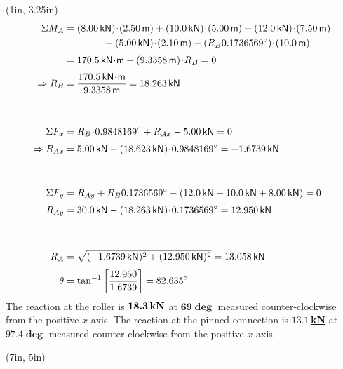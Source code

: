 \documentclass[10pt,oneside]{article}
\begin{document}
\begin{textblock*}{4.75in}(1in, 3.25in) 
  \begin{align*}
    \Sigma M_A &= (8.00\,\mathsf{kN})\cd(2.50\,\mathsf{m})+(10.0\,\mathsf{kN})\cd(5.00\,\mathsf{m})+(12.0\,\mathsf{kN})\cd(7.50\,\mathsf{m})\\
    &\qquad\qquad +(5.00\,\mathsf{kN})\cd(2.10\,\mathsf{m})-(R_B\sin 69\deg)\cd(10.0\,\mathsf{m})\\[0.25em]
    &= 170.5\,\mathsf{kN\cd m}-(9.3358\,\mathsf{m})\cd R_B = 0 \\[0.25em]
    \Ra R_B &= \frac{170.5\,\mathsf{kN\cd m}}{9.3358\,\mathsf{m}} = 18.263\,\mathsf{kN} \\\\\\
    \Sigma F_x &= R_B\cd\cos 69\deg + R_{Ax} - 5.00\,\mathsf{kN} = 0 \\[0.25em]
    \Ra R_{Ax} &= 5.00\,\mathsf{kN} - (18.623\,\mathsf{kN})\cd\cos 69\deg = -1.6739\,\mathsf{kN}\\\\\\
    \Sigma F_y &= R_{Ay}+R_B\sin 69\deg -(12.0\,\mathsf{kN}+10.0\,\mathsf{kN}+8.00\,\mathsf{kN}) = 0 \\[0.25em]
    R_{Ay} &= 30.0\,\mathsf{kN}-(18.263\,\mathsf{kN})\cd\sin 69\deg = 12.950\,\mathsf{kN} \\\\\\
    R_A &= \sqrt{(-1.6739\,\mathsf{kN})^2+(12.950\,\mathsf{kN})^2} = 13.058\,\mathsf{kN}\\[0.25em]
    \theta &= \tan^{-1}\left[\frac{12.950}{1.6739}\right] = 82.635\deg
  \end{align*}
  \large\parb\centering
  The reaction at the roller is  \underline{$\bm{18.3}\,\mathsf{\bf kN}$} at \underline{$\bm{69\deg}$} measured counter-clockwise from the positive $x$-axis.
  \parb
  The reaction at the pinned connection is \underline{$\bm{13.1\,}${\bf kN}} at \underline{$\bm{97.4\deg}$} measured counter-clockwise from the positive $x$-axis.
\end{textblock*}
\begin{textblock*}{2in}(7in, 5in) 
\end{textblock*}
\end{document}
